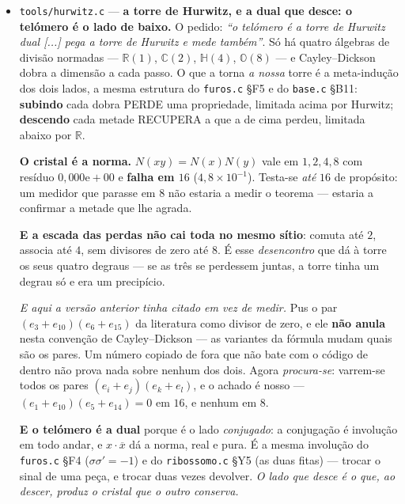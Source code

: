 \documentclass[11pt]{article}
\newcommand{\code}[1]{\texttt{\small #1}}
\newcommand{\R}{\mathbb R}
\newcommand{\C}{\mathbb C}
\theoremstyle{plain}
\theoremstyle{remark}
\begin{document}
\begin{itemize}
\emph{E a versão anterior tinha posto a descida como divisão.} A correcção veio de fora: \emph{``no dual apenas troca o
sinal da multiplicação''} --- e é literal, com $\sigma\cdot\sigma'=-1$ exato em todo metal. O dual
não desfaz a multiplicação com uma operação nova: multiplica com a polaridade invertida, uma peça só.
A diferença importa porque só a troca de sinal é \textbf{involução}, e é por isso que a torre dual
volta sem resto --- com um controlo não-involutivo a provar que o teste mede mesmo involução.

\item \code{tools/hurwitz.c} --- \textbf{a torre de Hurwitz, e a dual que desce: o telómero é o
lado de baixo.} O pedido: \emph{``o telómero é a torre de Hurwitz dual [...] pega a torre de Hurwitz e
mede também''}. Só há quatro álgebras de divisão normadas --- $\R(1)$, $\C(2)$, $\mathbb{H}(4)$,
$\mathbb{O}(8)$ --- e Cayley--Dickson dobra a dimensão a cada passo. O que a torna \emph{a nossa}
torre é a meta-indução dos dois lados, a mesma estrutura do \code{furos.c} §F5 e do \code{base.c}
§B11: \textbf{subindo} cada dobra PERDE uma propriedade, limitada acima por Hurwitz;
\textbf{descendo} cada metade RECUPERA a que a de cima perdeu, limitada abaixo por $\R$.

\textbf{O cristal é a norma.} $N(xy)=N(x)N(y)$ vale em $1,2,4,8$ com resíduo $0{,}000\mathrm{e}{+}00$
e \textbf{falha em $16$} ($4{,}8\times10^{-1}$). Testa-se \emph{até} $16$ de propósito: um medidor que
parasse em $8$ não estaria a medir o teorema --- estaria a confirmar a metade que lhe agrada.

\textbf{E a escada das perdas não cai toda no mesmo sítio}: comuta até $2$, associa até $4$, sem
divisores de zero até $8$. É esse \emph{desencontro} que dá à torre os seus quatro degraus --- se as
três se perdessem juntas, a torre tinha um degrau só e era um precipício.

\emph{E aqui a versão anterior tinha citado em vez de medir.} Pus o par $(e_3+e_{10})(e_6+e_{15})$ da literatura como
divisor de zero, e ele \textbf{não anula} nesta convenção de Cayley--Dickson --- as variantes da
fórmula mudam quais são os pares. Um número copiado de fora que não bate com o código de dentro não
prova nada sobre nenhum dos dois. Agora \emph{procura-se}: varrem-se todos os pares
$(e_i+e_j)(e_k+e_l)$, e o achado é nosso --- $(e_1+e_{10})(e_5+e_{14})=0$ em $16$, e nenhum em $8$.

\textbf{E o telómero é a dual} porque é o lado \emph{conjugado}: a conjugação é involução em todo
andar, e $x\cdot\overline{x}$ dá a norma, real e pura. É a mesma involução do \code{furos.c} §F4
($\sigma\sigma'=-1$) e do \code{ribossomo.c} §Y5 (as duas fitas) --- trocar o sinal de uma peça, e
trocar duas vezes devolver. \emph{O lado que desce é o que, ao descer, produz o cristal que o outro
conserva.}


\end{itemize}
\end{document}
